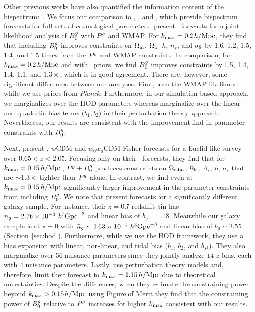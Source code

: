 Other previous works have also quantified the information content of the
bispectrum:~\citep[\eg][]{scoccimarro2004, sefusatti2006, sefusatti2007,
song2015, tellarini2016, yamauchi2017a, karagiannis2018, yankelevich2019,
chudaykin2019, coulton2019, reischke2019, agarwal2020}. 
We focus our comparison to \cite{sefusatti2006}, \cite{yankelevich2019},
\cite{agarwal2020} and \cite{chudaykin2019}, which provide bispectrum forecasts for 
full sets of cosmological parameters.
\cite{sefusatti2006} present \lcdm~forecasts for a joint likelihood analysis of
$B^g_0$ with $P^g$ and WMAP. For $k_{\rm max} = 0.2\,h/\mathrm{Mpc}$, they find that including
$B^g_0$ improves constraints on $\Omega_{\rm m}$, $\Omega_{\rm b}$, $h$, $n_s$, and $\sigma_8$ by 1.6, 1.2,
1.5, 1.4, and 1.5 times from the $P^g$ and WMAP constraints. In comparison, for 
$k_{\rm max} = 0.2\,h/\mathrm{Mpc}$ and with \planck~priors, we find $B^g_0$ improves constraints
by  1.5, 1.4, 1.4, 1.1, and $1.3\times$, which is in good agreement. There are,
however, some significant differences between our analyses. First, \cite{sefusatti2006} 
uses the WMAP likelihood while we use priors from {\em Planck}. Furthermore, 
in our simulation-based approach, we marginalizes over the HOD parameters
whereas \cite{sefusatti2006} marginalize over the linear and quadratic bias
terms ($b_1, b_2$) in their perturbation theory approach. Nevertheless, our
results are consistent with the improvement \cite{sefusatti2006} find in
parameter constraints with $B^g_0$. 

Next, \cite{yankelevich2019} present \lcdm, $w$CDM and $w_0w_a$CDM Fisher
forecasts for a Euclid-like survey~\citep{laureijs2011} over $0.65 < z < 2.05$.
Focusing only on their \lcdm~forecasts, they find that for $k_{\rm max} = 0.15\,h/\mathrm{Mpc}$, 
$P^g+B^g_0$ produces constraints on $\Omega_{\rm cdm}$, $\Omega_{\rm b}$, $A_s$, $h$, $n_s$ 
that are ${\sim}1.3\times$ tighter than $P^g$ alone. In contrast, we find even
at $k_{\rm max}=0.15\,h/\mathrm{Mpc}$ significantly larger improvement in the parameter constraints 
from including $B^g_0$. We note that \cite{yankelevich2019} present forecasts for
a significantly different galaxy sample. For instance, their $z = 0.7$ redshift
bin has $\bar{n}_g = 2.76 \times 10^{-3}~h^3{\rm Gpc}^{-3}$ and linear bias of
$b_g = 1.18$. Meanwhile our galaxy sample is at $z=0$ with $\bar{n}_g \sim 1.63\times
10^{-4}~h^3{\rm Gpc}^{-3}$ and linear bias of $b_g \sim 2.55$
(Section~\ref{sec:hod}). Furthermore, while we use the HOD framework, they use
a bias expansion with linear, non-linear, and tidal bias ($b_1$, $b_2$, and
$b_{s^2}$). They also marginalize over 56 nuisance parameters since they
jointly analyze $14$ $z$ bins, each with $4$ nuisance parameters.  Lastly,
\cite{yankelevich2019} use perturbation theory models and, therefore, limit
their forecast to $k_{\rm max} = 0.15\,h/\mathrm{Mpc}$ due
to theoretical uncertainties. Despite the differences, when they estimate the constraining
power beyond $k_{\rm max} > 0.15\,h/\mathrm{Mpc}$ using Figure of Merit they find that the
constraining power of $B^g_0$ relative to $P^g$ increases for higher $k_{\rm max}$
consistent with our results. 

